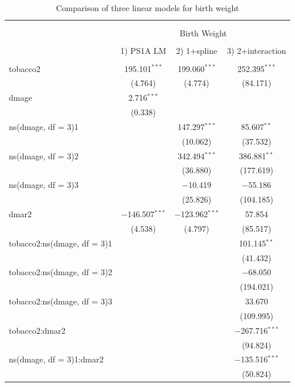 \documentclass[letterpaper, 12pt]{article}
\begin{document}
\begin{table}[!htbp] \centering 
  \caption{Comparison of three linear models for birth weight} 
  \label{tab:splineresults} 
\begin{tabular}{@{\extracolsep{5pt}}lccc} 
\\[-1.8ex]\hline 
\hline \\[-1.8ex] 
\\[-1.8ex] & \multicolumn{3}{c}{Birth Weight} \\ 
\\[-1.8ex] & 1) PS1A LM & 2) 1+spline & 3) 2+interaction\\ 
\hline \\[-1.8ex] 
 tobacco2 & 195.101$^{***}$ & 199.060$^{***}$ & 252.395$^{***}$ \\ 
  & (4.764) & (4.774) & (84.171) \\ 
  dmage & 2.716$^{***}$ &  &  \\ 
  & (0.338) &  &  \\ 
  ns(dmage, df = 3)1 &  & 147.297$^{***}$ & 85.607$^{**}$ \\ 
  &  & (10.062) & (37.532) \\ 
  ns(dmage, df = 3)2 &  & 342.494$^{***}$ & 386.881$^{**}$ \\ 
  &  & (36.880) & (177.619) \\ 
  ns(dmage, df = 3)3 &  & $-$10.419 & $-$55.186 \\ 
  &  & (25.826) & (104.185) \\ 
  dmar2 & $-$146.507$^{***}$ & $-$123.962$^{***}$ & 57.854 \\ 
  & (4.538) & (4.797) & (85.517) \\ 
  tobacco2:ns(dmage, df = 3)1 &  &  & 101.145$^{**}$ \\ 
  &  &  & (41.432) \\ 
  tobacco2:ns(dmage, df = 3)2 &  &  & $-$68.050 \\ 
  &  &  & (194.021) \\ 
  tobacco2:ns(dmage, df = 3)3 &  &  & 33.670 \\ 
  &  &  & (109.995) \\ 
  tobacco2:dmar2 &  &  & $-$267.716$^{***}$ \\ 
  &  &  & (94.824) \\ 
  ns(dmage, df = 3)1:dmar2 &  &  & $-$135.516$^{***}$ \\ 
  &  &  & (50.824) \\ 

\end{tabular}
\end{table}
\end{document}
